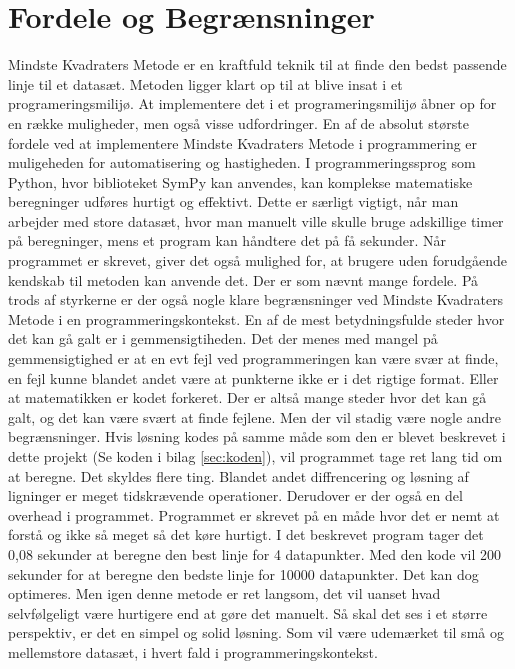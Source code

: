 \section{Fordele og Begrænsninger}\label{sec:fordeleOgBegrensninger}
Mindste Kvadraters Metode er en kraftfuld teknik til at finde den bedst passende linje til et datasæt. Metoden ligger klart op til at blive insat i et programeringsmilijø. At implementere det i et programeringsmilijø åbner op for en række muligheder, men også visse udfordringer. En af de absolut største fordele ved at implementere Mindste Kvadraters Metode i programmering er muligeheden for automatisering og hastigheden. I programmeringssprog som Python, hvor biblioteket SymPy kan anvendes, kan komplekse matematiske beregninger udføres hurtigt og effektivt. Dette er særligt vigtigt, når man arbejder med store datasæt, hvor man manuelt ville skulle bruge adskillige timer på beregninger, mens et program kan håndtere det på få sekunder. Når programmet er skrevet, giver det også mulighed for, at brugere uden forudgående kendskab til metoden kan anvende det. Der er som nævnt mange fordele. På trods af styrkerne er der også nogle klare begrænsninger ved Mindste Kvadraters Metode i en programmeringskontekst. En af de mest betydningsfulde steder hvor det kan gå galt er i gemmensigtiheden. Det der menes med mangel på gemmensigtighed er at en evt fejl ved programmeringen kan være svær at finde, en fejl kunne blandet andet være at punkterne ikke er i det rigtige format. Eller at matematikken er kodet forkeret. Der er altså mange steder hvor det kan gå galt, og det kan være svært at finde fejlene. Men der vil stadig være nogle andre begrænsninger. Hvis løsning kodes på samme måde som den er blevet beskrevet i dette projekt (Se koden i bilag \ref{sec:koden}), vil programmet tage ret lang tid om at beregne. Det skyldes flere ting. Blandet andet diffrencering og løsning af ligninger er meget tidskrævende operationer. Derudover er der også en del overhead i programmet. Programmet er skrevet på en måde hvor det er nemt at forstå og ikke så meget så det køre hurtigt. I det beskrevet program tager det 0,08 sekunder at beregne den best linje for 4 datapunkter. Med den kode vil 200 sekunder for at beregne den bedste linje for 10000 datapunkter. Det kan dog optimeres. Men igen denne metode er ret langsom, det vil uanset hvad selvfølgeligt være hurtigere end at gøre det manuelt. Så skal det ses i et større perspektiv, er det en simpel og solid løsning. Som vil være udemærket til små og mellemstore datasæt, i hvert fald i programmeringskontekst.

